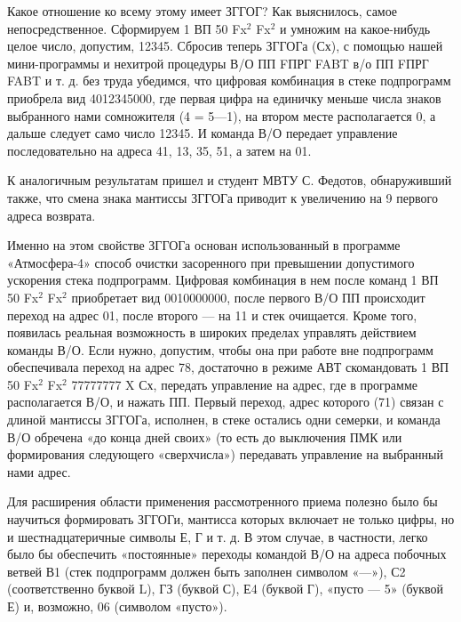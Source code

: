 \documentclass[11pt,a4paper,oneside]{article}
\begin{document}
Какое отношение ко всему этому имеет ЗГГОГ? Как выяснилось, самое непосредственное. Сформируем 1 ВП 50 Fx$^{2}$ Fx$^{2}$ и умножим на какое-нибудь целое число, допустим, 12345. Сбросив теперь ЗГГОГа (Сх), с помощью нашей мини-программы и нехитрой процедуры В/О ПП FПРГ FABT в/о ПП FПРГ FABT и т. д. без труда убедимся, что цифровая комбинация в стеке подпрограмм приобрела вид 4012345000, где первая цифра на единичку меньше числа знаков выбранного нами сомножителя (4 = 5—1), на втором месте располагается 0, а дальше следует само число 12345. И команда В/О передает управление последовательно на адреса 41, 13, 35, 51, а затем на 01.

К аналогичным результатам пришел и студент МВТУ С. Федотов, обнаруживший также, что смена знака мантиссы ЗГГОГа приводит к увеличению на 9 первого адреса возврата.

Именно на этом свойстве ЗГГОГа основан использованный в программе «Атмосфера-4» способ очистки засоренного при превышении допустимого ускорения стека подпрограмм. Цифровая комбинация в нем после команд 1 ВП 50 Fx$^{2}$ Fx$^{2}$ приобретает вид 0010000000, после первого В/О ПП происходит переход на адрес 01, после второго — на 11 и стек очищается. Кроме того, появилась реальная возможность в широких пределах управлять действием команды В/О. Если нужно, допустим, чтобы она при работе вне подпрограмм обеспечивала переход на адрес 78, достаточно в режиме АВТ скомандовать 1 ВП 50 Fx$^{2}$ Fx$^{2}$ 77777777 X Сх, передать управление на адрес, где в программе располагается В/О, и нажать ПП. Первый переход, адрес которого (71) связан с длиной мантиссы ЗГГОГа, исполнен, в стеке остались одни семерки, и команда В/О обречена «до конца дней своих» (то есть до выключения ПМК или формирования следующего «сверхчисла») передавать управление на выбранный нами адрес.

Для расширения области применения рассмотренного приема полезно было бы научиться формировать ЗГГОГи, мантисса которых включает не только цифры, но и шестнадцатеричные символы Е, Г и т. д. В этом случае, в частности, легко было бы обеспечить «постоянные» переходы командой В/О на адреса побочных ветвей В1 (стек подпрограмм должен быть заполнен символом «—»), С2 (соответственно буквой L), ГЗ (буквой С), Е4 (буквой Г), «пусто — 5» (буквой Е) и, возможно, 06 (символом «пусто»).
\end{document}
